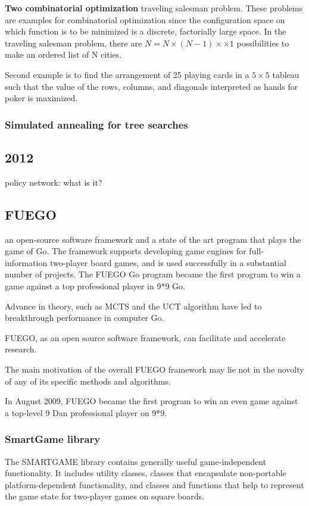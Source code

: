 \textbf{Two combinatorial optimization}
traveling salesman problem. These problems are examples for combinatorial optimization since the configuration space on which function is to be minimized is a discrete, factorially large space. In the traveling salesman problem, there are $N = N \times (N-1) \times \times 1$ possibilities to make an ordered list of N cities.

Second example is to find the arrangement of 25 playing cards in a $5 \times 5$ tableau such that the value of the rows, columns, and diagonals interpreted as hands for poker is maximized.

\subsubsection{Simulated annealing for tree searches}

\subsection{2012}
policy network:
what is it?

\subsection{FUEGO}
an open-source software framework and a state of the art program that plays the game of Go. The framework supports developing game engines for full-information two-player board games, and is used successfully in a substantial number of projects. The FUEGO Go program became the first program to win a game against a top professional player in 9*9 Go.

Advance in theory, such as MCTS and the UCT algorithm have led to breakthrough performance in computer Go.

FUEGO, as an open source software framework, can facilitate and accelerate research. 

The main motivation of the overall FUEGO framework may lie not in the novolty of any of its specific methods and algorithms.

In August 2009, FUEGO became the first program to win an even game against a top-level 9 Dan professional player on 9*9.

\subsubsection{SmartGame library}
The SMARTGAME library contains generally useful game-independent functionality. It includes utility classes, classes that encapsulate non-portable platform-dependent functionality, and classes and functions that help to represent the game state for two-player games on square boards.

